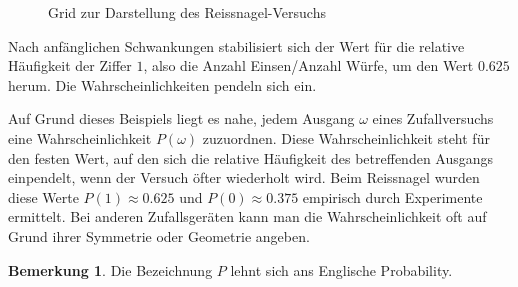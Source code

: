 \documentclass[%
<<<<<<< Updated upstream
<<<<<<< Updated upstream
11pt,%
twoside,%
titlepage,%
german,%
=======
=======
>>>>>>> Stashed changes
11pt,%
twoside,%
titlepage,%
swissgerman,%
<<<<<<< Updated upstream
>>>>>>> Stashed changes
=======
>>>>>>> Stashed changes
headsepline%
]{scrartcl}
\theoremstyle{definition}
\newtheorem{bem}{Bemerkung}[subsection] %
\theoremstyle{plain}
\newcounter{theo}[section]\setcounter{theo}{0}
\begin{document}
\begin{figure}
\centering
{}
\caption{Grid zur Darstellung des Reiss\-nagel-\-Versuchs}\label{graph}
\end{figure}

Nach anfänglichen Schwankungen stabilisiert sich der Wert für die relative Häufigkeit der Ziffer $1$, also die Anzahl Einsen/Anzahl Würfe, um den Wert $0.625$ herum. Die Wahrscheinlichkeiten \glqq pendeln sich ein\grqq.

Auf Grund dieses Beispiels liegt es nahe, jedem Ausgang $\omega$ eines Zufallversuchs eine Wahrscheinlichkeit $P(\omega)$ zuzuordnen. Diese Wahrscheinlichkeit steht für den festen Wert, auf den sich die relative Häufigkeit des betreffenden Ausgangs einpendelt, wenn der Versuch öfter wiederholt wird. Beim Reissnagel wurden diese Werte $P(1)\approx0.625$ und $P(0)\approx0.375$ empirisch durch Experimente ermittelt. Bei anderen Zufallsgeräten kann man die Wahrscheinlichkeit oft auf Grund ihrer Symmetrie oder Geometrie angeben.

\begin{bem}
Die Bezeichnung $P$ lehnt sich ans Englische Probability.
\end{bem}
\end{document}
